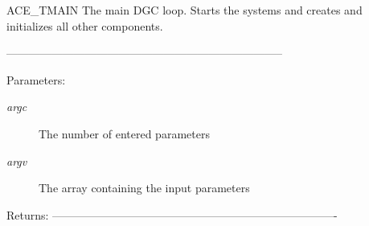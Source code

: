 ACE\_\-TMAIN The main DGC loop. Starts the systems and creates and initializes all other components. 

-------------------------------------------------------------------------- 

\begin{Desc}
\item[Parameters:]
\begin{description}
\item[{\em argc}]The number of entered parameters \item[{\em argv}]The array containing the input parameters\end{description}
\end{Desc}
\begin{Desc}
\item[Returns:]---------------------------------------------------------------------------- \end{Desc}
